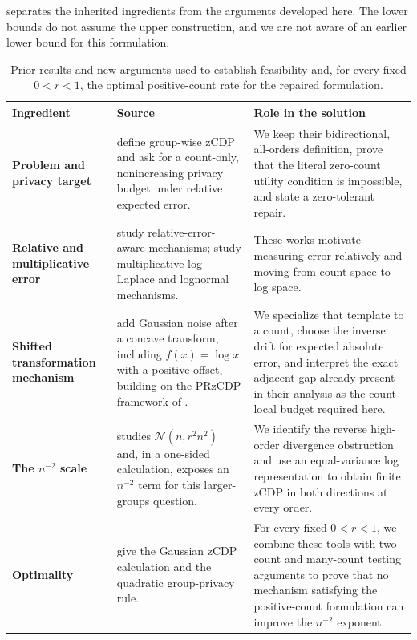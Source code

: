 \documentclass[11pt]{article}
\newcommand{\N}{\mathcal{N}}
\theoremstyle{definition}
\begin{document}
 separates the inherited ingredients from the arguments developed here. The lower bounds do not assume the upper construction, and we are not aware of an earlier lower bound for this formulation.

\begin{table}[t]
\centering
\footnotesize
\begin{tabularx}{\textwidth}{@{}L{0.225\textwidth}Y Y@{}}
\toprule
\textbf{Ingredient} & \textbf{Source} & \textbf{Role in the solution} \\
\midrule
\textbf{Problem and privacy target}
& \citet{PujolDesfontaines2023} define group-wise zCDP and ask for a count-only, nonincreasing privacy budget under relative expected error.
& We keep their bidirectional, all-orders definition, prove that the literal zero-count utility condition is impossible, and state a zero-tolerant repair. \\
\addlinespace[0.35em]
\cmidrule(lr){1-3}
\addlinespace[0.25em]
\textbf{Relative and multiplicative error}
& \citet{XiaoEtAl2011} study relative-error-aware mechanisms; \citet{LeNyPappas2013} study multiplicative log-Laplace and lognormal mechanisms.
& These works motivate measuring error relatively and moving from count space to log space. \\
\addlinespace[0.35em]
\cmidrule(lr){1-3}
\addlinespace[0.25em]
\textbf{Shifted transformation mechanism}
& \citet{FinleyEtAl2026} add Gaussian noise after a concave transform, including $f(x)=\log x$ with a positive offset, building on the PRzCDP framework of \citet{SeemanEtAl2024}.
& We specialize that template to a count, choose the inverse drift for expected absolute error, and interpret the exact adjacent gap already present in their analysis as the count-local budget required here. \\
\addlinespace[0.35em]
\cmidrule(lr){1-3}
\addlinespace[0.25em]
\textbf{The $n^{-2}$ scale}
& \citet{Azize2023} studies $\N(n,r^2n^2)$ and, in a one-sided calculation, exposes an $n^{-2}$ term for this larger-groups question.
& We identify the reverse high-order divergence obstruction and use an equal-variance log representation to obtain finite zCDP in both directions at every order. \\
\addlinespace[0.35em]
\cmidrule(lr){1-3}
\addlinespace[0.25em]
\textbf{Optimality}
& \citet{BunSteinke2016} give the Gaussian zCDP calculation and the quadratic group-privacy rule.
& For every fixed $0<r<1$, we combine these tools with two-count and many-count testing arguments to prove that no mechanism satisfying the positive-count formulation can improve the $n^{-2}$ exponent. \\
\bottomrule
\end{tabularx}
\caption{Prior results and new arguments used to establish feasibility and, for every fixed $0<r<1$, the optimal positive-count rate for the repaired formulation.}
\label{tab:prior}
\end{table}
\end{document}
